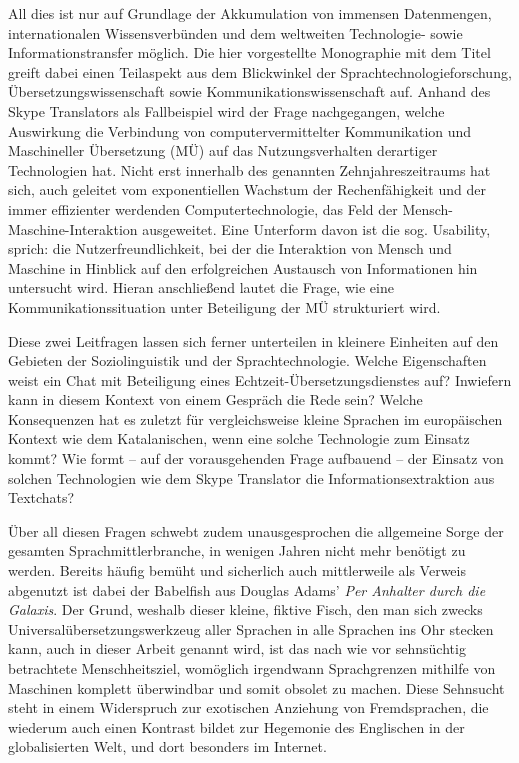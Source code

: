 All dies ist nur auf Grundlage der Akkumulation von immensen Datenmengen, internationalen Wissensverbünden und dem weltweiten Technologie- sowie Informationstransfer möglich. Die hier vorgestellte Monographie mit dem Titel \emph{\ttitle{}} greift dabei einen Teilaspekt aus dem Blickwinkel der Sprachtechnologieforschung, Übersetzungswissenschaft sowie Kommunikationswissenschaft auf. Anhand des Skype Translators als Fallbeispiel wird der Frage nachgegangen, welche Auswirkung die Verbindung von computervermittelter Kommunikation und Maschineller Übersetzung (MÜ) auf das Nutzungsverhalten derartiger Technologien hat. Nicht erst innerhalb des genannten Zehnjahreszeitraums hat sich, auch geleitet vom exponentiellen Wachstum der Rechenfähigkeit und der immer effizienter werdenden Computertechnologie, das Feld der Mensch-Maschine-Interaktion ausgeweitet. Eine Unterform davon ist die sog. Usability, sprich: die Nutzerfreundlichkeit, bei der die Interaktion von Mensch und Maschine in Hinblick auf den erfolgreichen Austausch von Informationen hin untersucht wird. Hieran anschließend lautet die Frage, wie eine Kommunikationssituation unter Beteiligung der MÜ strukturiert wird.

Diese zwei Leitfragen lassen sich ferner unterteilen in kleinere Einheiten auf den Gebieten der Soziolinguistik und der Sprachtechnologie. Welche Eigenschaften weist ein Chat mit Beteiligung eines Echtzeit-Übersetzungsdienstes auf? Inwiefern kann in diesem Kontext von einem Gespräch die Rede sein? Welche Konsequenzen hat es zuletzt für vergleichsweise kleine Sprachen im europäischen Kontext wie dem Katalanischen, wenn eine solche Technologie zum Einsatz kommt? Wie formt -- auf der vorausgehenden Frage aufbauend -- der Einsatz von solchen Technologien wie dem Skype Translator die Informationsextraktion aus Textchats?

Über all diesen Fragen schwebt zudem unausgesprochen die allgemeine Sorge der gesamten Sprachmittlerbranche, in wenigen Jahren nicht mehr benötigt zu werden. Bereits häufig bemüht und sicherlich auch mittlerweile als Verweis abgenutzt ist dabei der Babelfish aus Douglas Adams' \emph{Per Anhalter durch die Galaxis}. Der Grund, weshalb dieser kleine, fiktive Fisch, den man sich zwecks Universalübersetzungswerkzeug aller Sprachen in alle Sprachen ins Ohr stecken kann, auch in dieser Arbeit genannt wird, ist das nach wie vor sehnsüchtig betrachtete Menschheitsziel, womöglich irgendwann Sprachgrenzen mithilfe von Maschinen komplett überwindbar und somit obsolet zu machen. Diese Sehnsucht steht in einem Widerspruch zur exotischen Anziehung von Fremdsprachen, die wiederum auch einen Kontrast bildet zur Hegemonie des Englischen in der globalisierten Welt, und dort besonders im Internet. 

